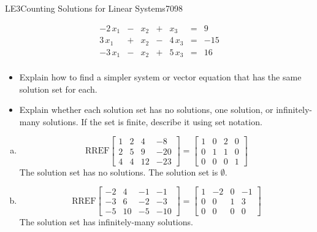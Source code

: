 \begin{exercise}{LE3}{Counting Solutions for Linear Systems}{7098}
\begin{exerciseStatement}
\begin{enumerate}[(a)]
 \[
              \begin{matrix}
 -2 \, x_{1} &  -  & x_{2} &  +  & x_{3} & = & 9 \\
 3 \, x_{1} &  +  & x_{2} &  -  & 4 \, x_{3} & = & -15 \\
 -3 \, x_{1} &  -  & x_{2} &  +  & 5 \, x_{3} & = & 16 \\
 \end{matrix}
            \] 

 
\end{enumerate}

     

\begin{itemize}
\item  

 Explain how to find a simpler system or vector equation that has the same solution set for each. 

 
\item  

 Explain whether each solution set has no solutions, one solution, or infinitely-many solutions. If the set is finite, describe it using set notation. 

 
\end{itemize}

     \end{exerciseStatement}
 \begin{exerciseAnswer} 

\begin{enumerate}[(a)]
\item  

 \[\mathrm{RREF}\left[\begin{array}{ccc|c}
1 & 2 & 4 & -8 \\
2 & 5 & 9 & -20 \\
4 & 4 & 12 & -23
\end{array}\right]=\left[\begin{array}{ccc|c}
1 & 0 & 2 & 0 \\
0 & 1 & 1 & 0 \\
0 & 0 & 0 & 1
\end{array}\right]\] The solution set has no solutions. The solution set is \(\emptyset\). 

 
\item  

 \[\mathrm{RREF}\left[\begin{array}{ccc|c}
-2 & 4 & -1 & -1 \\
-3 & 6 & -2 & -3 \\
-5 & 10 & -5 & -10
\end{array}\right]=\left[\begin{array}{ccc|c}
1 & -2 & 0 & -1 \\
0 & 0 & 1 & 3 \\
0 & 0 & 0 & 0
\end{array}\right]\] The solution set has infinitely-many solutions. 


\end{enumerate}
\end{exerciseAnswer}
\end{exercise}
